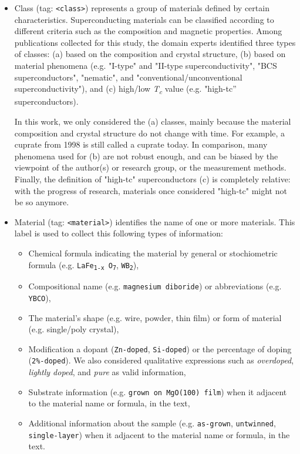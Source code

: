 \documentclass[fleqn,10pt]{wlscirep}
\begin{document}
\begin{itemize}
\item Class (tag: \texttt{<class>}) represents a group of materials defined by certain characteristics.
Superconducting materials can be classified according to different criteria such as the composition and magnetic properties. 
Among publications collected for this study, the domain experts identified three types of classes: (a) based on the composition and crystal structure, (b) based on material phenomena (e.g. "I-type" and "II-type superconductivity", "BCS superconductors", "nematic", and "conventional/unconventional superconductivity"), and (c) high/low \textit{T\textsubscript{c}} value (e.g. "high-tc” superconductors). 

In this work, we only considered the (a) classes, mainly because the material composition and crystal structure do not change with time. For example, a cuprate from 1998 is still called a cuprate today. 
In comparison, many phenomena used for (b) are not robust enough, and can be biased by the viewpoint of the author(s) or research group, or the measurement methods. 
Finally, the definition of "high-tc" superconductors (c) is completely relative: with the progress of research, materials once considered "high-tc" might not be so anymore.

\item Material (tag: \texttt{<material>}) identifies the name of one or more materials. 
This label is used to collect this following types of information: 
\begin{itemize}
    \item Chemical formula indicating the material by general or stochiometric formula (e.g. \texttt{LaFe\textsubscript{1-x} O\textsubscript{7}}, \texttt{WB\textsubscript{2}}),
    \item Compositional name (e.g. \texttt{magnesium diboride}) or abbreviations (e.g. \texttt{YBCO}), 
    \item The material's shape (e.g. wire, powder, thin film) or form of material (e.g. single/poly crystal), 
    \item Modification a dopant (\texttt{Zn-doped}, \texttt{Si-doped}) or the percentage of doping (\texttt{2\%-doped}). We also considered qualitative expressions such as \textit{overdoped}, \textit{lightly doped}, and \textit{pure} as valid information, 
    \item Substrate information (e.g. \texttt{grown on MgO(100) film}) when it adjacent to the material name or formula, in the text,
    \item Additional information about the sample (e.g. \texttt{as-grown}, \texttt{untwinned}, \texttt{single-layer}) when it adjacent to the material name or formula, in the text. 
\end{itemize}


\end{itemize}
\end{document}
